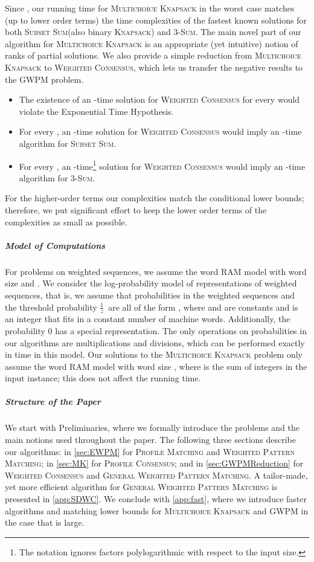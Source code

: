 \documentclass{article}
\theoremstyle{plain}
\theoremstyle{definition}
\newcommand{\MK}{\textsc{Multichoice Knapsack}\xspace}
\newcommand{\PM}{\textsc{Profile Matching}\xspace}
\newcommand{\WPM}{\textsc{Weighted Pattern Matching}\xspace}
\newcommand{\GWPM}{\textsc{GWPM}\xspace}
\newcommand{\GWPMFull}{\textsc{General Weighted Pattern Matching}\xspace}
\newcommand{\WC}{\textsc{Weighted Consensus}\xspace}
\newcommand{\PC}{\textsc{Profile Consensus}\xspace}
\newcommand{\Knapsack}{\textsc{Knapsack}\xspace}
\newcommand{\SubsetSum}{\textsc{Subset Sum}\xspace}
\newcommand{\Sum}{\textsc{Sum}\xspace}
\newcommand{\fr}{\ensuremath{\frac1z}}
\begin{document}
  Since , our running time for \MK in the worst case matches (up to lower order terms) the time complexities of the fastest known solutions
  for both \SubsetSum (also binary \Knapsack) and 3-\Sum. 
  The main novel part of our algorithm for \MK is an appropriate (yet intuitive) notion of ranks of partial solutions.
  We also provide a simple reduction from \MK to \WC, which lets us transfer the negative results to the \GWPM problem.
  \begin{itemize}
    \item The existence of an -time solution for \WC for every   would violate the Exponential Time Hypothesis.
    \item For every , an -time solution for \WC would imply an -time algorithm for \SubsetSum.
    \item For every , an -time\footnote{
      The  notation ignores factors polylogarithmic with respect to the input size.
    } solution for \WC would imply an -time algorithm for 3-\Sum.
  \end{itemize}
  For the higher-order terms our complexities match the conditional lower bounds;
  therefore, we put significant effort to keep the lower order terms of the complexities
  as small as possible.

  \subparagraph*{Model of Computations}
  For problems on weighted sequences, we assume the word RAM model with word size  and .
We consider the log-probability model of representations of weighted sequences, that is, we assume that
  probabilities in the weighted sequences and the threshold probability \fr\ are all of the form ,
  where  and  are constants and  is an integer that fits in a constant number of machine words.
  Additionally, the probability 0 has a special representation.
  The only operations on probabilities in our algorithms are multiplications and divisions, which can be
  performed exactly in  time in this model.
  Our solutions to the \MK problem only assume the word RAM model with word size ,
  where  is the sum of integers in the input instance; this does not affect the  running time.

  \subparagraph*{Structure of the Paper}
  We start with Preliminaries, where we formally introduce the problems and the main notions used throughout the paper.
  The following three sections describe our algorithms: in \cref{sec:EWPM} for \PM and \WPM;
  in \cref{sec:MK} for \PC; and in \cref{sec:GWPMReduction} for \WC and \GWPMFull.
  A tailor-made, yet more efficient algorithm for \GWPMFull is presented in \cref{app:SDWC}.
  We conclude with \cref{app:fast}, where we introduce faster algorithms and matching lower bounds
  for \MK and \GWPM in the case that  is large.
\end{document}
